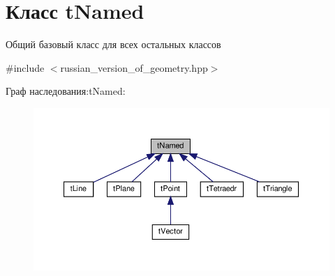 \hypertarget{classtNamed}{}\section{Класс t\+Named}
\label{classtNamed}


Общий базовый класс для всех остальных классов  




{\ttfamily \#include $<$russian\+\_\+version\+\_\+of\+\_\+geometry.\+hpp$>$}



Граф наследования\+:t\+Named\+:\nopagebreak
\begin{figure}[H]
\begin{center}
\leavevmode
\includegraphics[width=350pt]{classtNamed__inherit__graph}
\end{center}
\end{figure}
